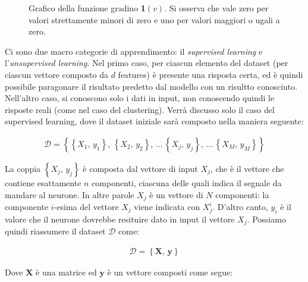 
\begin{figure}[!b]
    \centering
    
    \caption[Grafico della funzione gradino \textbf{1}$(v)$.]{Grafico della funzione gradino \textbf{1}$(v)$. Si osserva che vale zero per valori strettamente minori di zero e uno per valori maggiori o ugali a zero.}\label{fig:step-function}
\end{figure}


Ci sono due macro categorie di apprendimento: il \textsl{supervised learning} e l'\textsl{unsupervised learning}. Nel primo caso, per ciascun elemento del dataset (per ciascun vettore composto da $d$ features) è presente una risposta certa, ed è quindi possibile paragonare il risultato predetto dal modello con un risultto conosciuto. Nell'altro caso, si conoscono solo i dati in input, non conoscendo quindi le risposte reali (come nel caso del clustering). Verrà discusso solo il caso del supervised learning, dove il dataset iniziale sarà composto nella maniera seguente:

\begin{gather*}
    \mathcal{D} = \left\{ \left\{ X_1,\, y_1 \right\},\,\left\{ X_2,\, y_2 \right\},\,\dots\,\left\{ X_j,\, y_j \right\},\,\dots\,\left\{ X_M,\, y_M \right\} \right\}  
\end{gather*}

\noindent La coppia $\left\{ X_j,\, y_j \right\}$ è composta dal vettore di input $X_j$, che è il vettore che contiene esattamente $n$ componenti, ciascuna delle quali indica il segnale da mandare al neurone. In altre parole $X_j$ è un vettore di $N$ componenti: la componente $i$-esima del vettore $X_j$ viene indicata con $X_j^i$. D'altro canto, $y_i$ è il valore che il neurone dovrebbe resituire dato in input il vettore $X_j$. Possiamo quindi riassumere il dataset $\mathcal{D}$ come:

\begin{gather*}
    \mathcal{D} = \left\{ \mathbf{X},\, \mathbf{y} \right\}  
\end{gather*}

\noindent Dove $\mathbf{X}$ è una matrice ed $\mathbf{y}$ è un vettore composti come segue:

